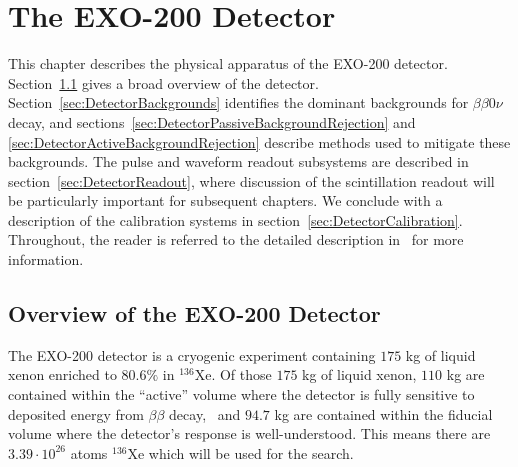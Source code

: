 \renewcommand{\thechapter}{3}
\chapter{The EXO-200 Detector}

This chapter describes the physical apparatus of the EXO-200 detector.  Section~\ref{sec:DetectorOverview} gives a broad overview of the detector.  Section~\ref{sec:DetectorBackgrounds} identifies the dominant backgrounds for $\beta\beta 0\nu$ decay, and sections~\ref{sec:DetectorPassiveBackgroundRejection} and \ref{sec:DetectorActiveBackgroundRejection} describe methods used to mitigate these backgrounds.  The pulse and waveform readout subsystems are described in section~\ref{sec:DetectorReadout}, where discussion of the scintillation readout will be particularly important for subsequent chapters.  We conclude with a description of the calibration systems in section~\ref{sec:DetectorCalibration}.  Throughout, the reader is referred to the detailed description in~\cite{detectorPartI} for more information.

\section{Overview of the EXO-200 Detector}\label{sec:DetectorOverview}

The EXO-200 detector is a cryogenic experiment containing $175$ kg of liquid xenon enriched to $80.6\%$ in $^{136}$Xe.  Of those $175$ kg of liquid xenon, $110$ kg are contained within the ``active'' volume where the detector is fully sensitive to deposited energy from $\beta\beta$ decay,~\cite{detectorPartI} and $94.7$ kg are contained within the fiducial volume where the detector's response is well-understood.  This means there are $3.39 \cdot 10^{26}$ atoms $^{136}$Xe which will be used for the search.~\cite{NewEXObb0nPaper_2014}

